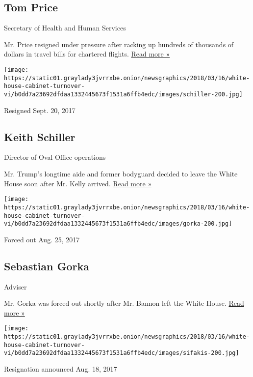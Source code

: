 \hypertarget{tom-price}{%
\subsection{Tom Price}\label{tom-price}}

Secretary of Health and Human Services

Mr. Price resigned under pressure after racking up hundreds of thousands
of dollars in travel bills for chartered flights.
\href{https://www.nytimes3xbfgragh.onion/2017/09/29/us/politics/tom-price-trump-hhs.html}{Read
more »}

\texttt{[image: https://static01.graylady3jvrrxbe.onion/newsgraphics/2018/03/16/white-house-cabinet-turnover-vi/b0dd7a23692dfdaa1332445673f1531a6ffb4edc/images/schiller-200.jpg]}

Resigned Sept. 20, 2017

\hypertarget{keith-schiller}{%
\subsection{Keith Schiller}\label{keith-schiller}}

Director of Oval Office operations

Mr. Trump's longtime aide and former bodyguard decided to leave the
White House soon after Mr. Kelly arrived.
\href{https://www.nytimes3xbfgragh.onion/2017/09/05/us/politics/keith-schiller-trump-white-house.html}{Read
more »}

\texttt{[image: https://static01.graylady3jvrrxbe.onion/newsgraphics/2018/03/16/white-house-cabinet-turnover-vi/b0dd7a23692dfdaa1332445673f1531a6ffb4edc/images/gorka-200.jpg]}

Forced out Aug. 25, 2017

\hypertarget{sebastian-gorka}{%
\subsection{Sebastian Gorka}\label{sebastian-gorka}}

Adviser

Mr. Gorka was forced out shortly after Mr. Bannon left the White House.
\href{https://www.nytimes3xbfgragh.onion/2017/08/25/us/politics/sebastian-gorka-leaves-white-house.html}{Read
more »}

\texttt{[image: https://static01.graylady3jvrrxbe.onion/newsgraphics/2018/03/16/white-house-cabinet-turnover-vi/b0dd7a23692dfdaa1332445673f1531a6ffb4edc/images/sifakis-200.jpg]}

Resignation announced Aug. 18, 2017


